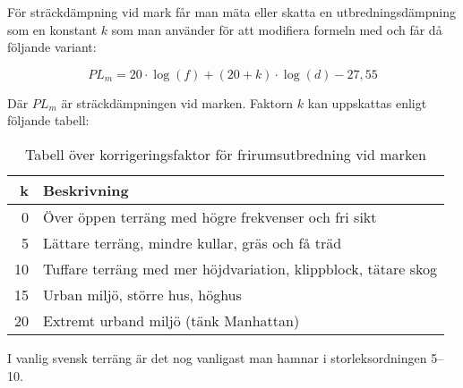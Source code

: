 För sträckdämpning vid mark får man mäta eller skatta en utbredningsdämpning som en konstant $k$ som man använder för att modifiera formeln med och får då följande variant:


\begin{equation*}
	PL_m = 20 \cdot \log(f) + (20+k) \cdot \log(d) - 27,55
\end{equation*}

Där $PL_m$ är sträckdämpningen vid marken. Faktorn $k$ kan uppskattas enligt följande tabell:

\begin{table}[h]
	\begin{centering}
		\begin{tabular}{r|l}
			\textbf{k} & \textbf{Beskrivning} \\ \hline
			0 & Över öppen terräng med högre frekvenser och fri sikt\\
			5 & Lättare terräng, mindre kullar, gräs och få träd \\
			10 & Tuffare terräng med mer höjdvariation, klippblock, tätare skog \\
			15 & Urban miljö, större hus, höghus \\
			20 & Extremt urband miljö (tänk Manhattan)\\
		\end{tabular}
	\end{centering}
	\label{tab:frirum-faktor}
	\caption{Tabell över korrigeringsfaktor för frirumsutbredning vid marken}
\end{table}

I vanlig svensk terräng är det nog vanligast man hamnar i storleksordningen 5--10.

\clearpage